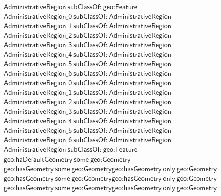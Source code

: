 \begin{align}
  \textsf{AdministrativeRegion}~\textsf{subClassOf:}~\textsf{geo:Feature}\\
  \textsf{AdministrativeRegion\_0}~\textsf{subClassOf:}~\textsf{AdministrativeRegion}\\
  \textsf{AdministrativeRegion\_1}~\textsf{subClassOf:}~\textsf{AdministrativeRegion}\\
  \textsf{AdministrativeRegion\_2}~\textsf{subClassOf:}~\textsf{AdministrativeRegion}\\
  \textsf{AdministrativeRegion\_3}~\textsf{subClassOf:}~\textsf{AdministrativeRegion}\\
  \textsf{AdministrativeRegion\_4}~\textsf{subClassOf:}~\textsf{AdministrativeRegion}\\
  \textsf{AdministrativeRegion\_5}~\textsf{subClassOf:}~\textsf{AdministrativeRegion}\\
  \textsf{AdministrativeRegion\_6}~\textsf{subClassOf:}~\textsf{AdministrativeRegion}\\
  \textsf{AdministrativeRegion\_0}~\textsf{subClassOf:}~\textsf{AdministrativeRegion}\\
  \textsf{AdministrativeRegion\_1}~\textsf{subClassOf:}~\textsf{AdministrativeRegion}\\
  \textsf{AdministrativeRegion\_2}~\textsf{subClassOf:}~\textsf{AdministrativeRegion}\\
  \textsf{AdministrativeRegion\_3}~\textsf{subClassOf:}~\textsf{AdministrativeRegion}\\
  \textsf{AdministrativeRegion\_4}~\textsf{subClassOf:}~\textsf{AdministrativeRegion}\\
  \textsf{AdministrativeRegion\_5}~\textsf{subClassOf:}~\textsf{AdministrativeRegion}\\
  \textsf{AdministrativeRegion\_6}~\textsf{subClassOf:}~\textsf{AdministrativeRegion}\\
  \textsf{AdministrativeRegion}~\textsf{subClassOf:}~\textsf{geo:Feature}\\
  \textsf{geo:haDefaultGeometry}~\textsf{some}~\textsf{geo:Geometry}\\
  \textsf{geo:hasGeometry}~\textsf{some}~\textsf{geo:Geometry}  \textsf{geo:hasGeometry}~\textsf{only}~\textsf{geo:Geometry}\\
  \textsf{geo:hasGeometry}~\textsf{some}~\textsf{geo:Geometry}  \textsf{geo:hasGeometry}~\textsf{only}~\textsf{geo:Geometry}\\
  \textsf{geo:hasGeometry}~\textsf{some}~\textsf{geo:Geometry}  \textsf{geo:hasGeometry}~\textsf{only}~\textsf{geo:Geometry}\\

\end{align}
